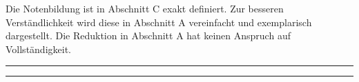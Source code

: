 \documentclass{article}
\begin{document}
	\vspace*{-1cm}
	Die Notenbildung ist in Abschnitt C exakt definiert. Zur besseren Verständlichkeit wird diese in Abschnitt A vereinfacht und exemplarisch dargestellt. Die Reduktion in Abschnitt A hat keinen Anspruch auf Vollständigkeit.
		
	\rule{\linewidth}{2pt}
	\renewcommand{\contentsname}{Abschnitte der Notentransparenz}
	\tableofcontents
	\rule{\linewidth}{2pt}
	
	
	
	\vspace{1cm}

	

	\clearpage
	
\end{document}
